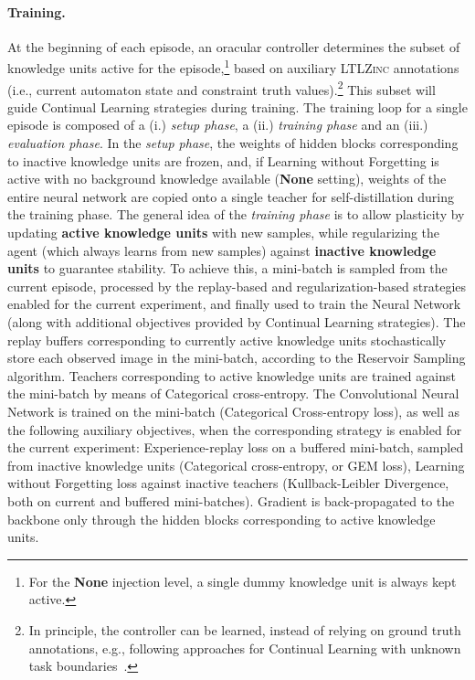 \paragraph{Training.} At the beginning of each episode, an oracular controller determines the subset of knowledge units active for the episode,\footnote{For the \textbf{None} injection level, a single dummy knowledge unit is always kept active.} based on auxiliary \textsc{LTLZinc} annotations (i.e., current automaton state and constraint truth values).\footnote{In principle, the controller can be learned, instead of relying on ground truth annotations, e.g., following approaches for Continual Learning with unknown task boundaries~\cite{zhu2024continual}.} This subset will guide Continual Learning strategies during training.
The training loop for a single episode is composed of a (i.) \textit{setup phase}, a (ii.) \textit{training phase} and an (iii.) \textit{evaluation phase}.
In the \textit{setup phase}, the weights of hidden blocks corresponding to inactive knowledge units are frozen, and, if Learning without Forgetting is active with no background knowledge available (\textbf{None} setting), weights of the entire neural network are copied onto a single teacher for self-distillation during the training phase.
%
The general idea of the \textit{training phase} is to allow plasticity by updating \textbf{active knowledge units} with new samples, while regularizing the agent (which always learns from new samples) against \textbf{inactive knowledge units} to guarantee stability. To achieve this, a mini-batch is sampled from the current episode, processed by the replay-based and regularization-based strategies enabled for the current experiment, and finally used to train the Neural Network (along with additional objectives provided by Continual Learning strategies).
The replay buffers corresponding to currently active knowledge units stochastically store each observed image in the mini-batch, according to the Reservoir Sampling algorithm. Teachers corresponding to active knowledge units are trained against the mini-batch by means of Categorical cross-entropy.
The Convolutional Neural Network is trained on the mini-batch (Categorical Cross-entropy loss), as well as the following auxiliary objectives, when the corresponding strategy is enabled for the current experiment: Experience-replay loss on a buffered mini-batch, sampled from inactive knowledge units (Categorical cross-entropy, or GEM loss), Learning without Forgetting loss against inactive teachers (Kullback-Leibler Divergence, both on current and buffered mini-batches). Gradient is back-propagated to the backbone only through the hidden blocks corresponding to active knowledge units.
